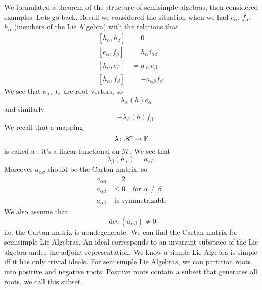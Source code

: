 We formulated a theorem of the structure of semisimple algebras,
then considered examples. Lets go back. Recall we considered the
situation when we had $e_{\alpha}$, $f_{\alpha}$, $h_{\alpha}$
(members of the Lie Algebra) with the relations that
\begin{subequations}
\begin{align}
[h_{\alpha}, h_{\beta}] &= 0\\
[e_{\alpha}, f_{\beta}] &= h_{\alpha}\delta_{\alpha\beta}\\
[h_{\alpha}, e_{\beta}] &= a_{\alpha\beta}e_{\beta}\\
[h_{\alpha}, f_{\beta}] &=-a_{\alpha\beta}f_{\beta}.
\end{align}
\end{subequations}
We see that $e_{\alpha}$, $f_{\alpha}$ are root vectors, so
\begin{equation}
[h, e_{\alpha}] = \lambda_{\alpha}(h)e_{\alpha}
\end{equation}
and similarly
\begin{equation}
[h, f_{\beta}] = -\lambda_{\beta}(h)f_{\beta}.
\end{equation}
We recall that a mapping
\begin{equation}
\lambda\colon\mathscr{H}\to\Bbb{F}
\end{equation}
is called a , it's a linear functional on
$\mathscr{H}$. We see that
\begin{equation}
\lambda_{\beta}(h_{\alpha})=a_{\alpha\beta}.
\end{equation}
Moreover $a_{\alpha\beta}$ should be the Cartan matrix, so 
\begin{subequations}
\begin{align}
a_{\alpha\alpha}&=2\\
a_{\alpha\beta}&\leq0\quad\mbox{for }\alpha\not=\beta\\
a_{\alpha\beta}&\mbox{ is symmetrizable}
\end{align}
\end{subequations}
We also assume that
\begin{equation}
\det(a_{\alpha\beta})\not=0
\end{equation}
i.e. the Cartan matrix is nondegenerate. We can find the Cartan
matrix for semisimple Lie Algebras. An ideal corresponds to an
invaraint subspace of the Lie algebra under the adjoint
representation. We know a simple Lie Algebra is simple iff it has
only trivial ideals. For semisimple Lie Algebras, we can
partition roots into positive and negative roots. Positive roots
contain a subset that generates all roots, we call this subset
.

